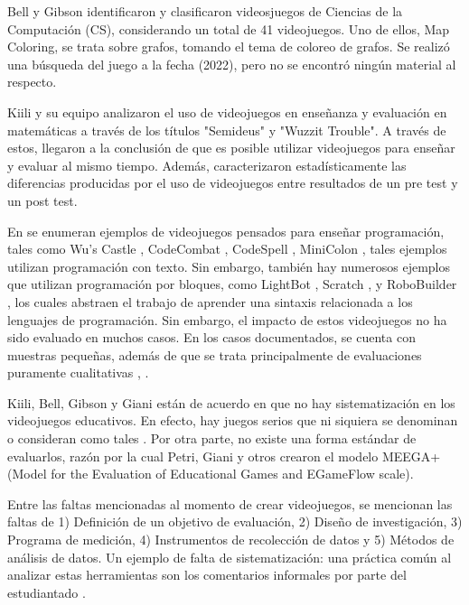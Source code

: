 \documentclass[submission]{eptcs}
\begin{document}
Bell y Gibson \cite{evaluation_of_games_for_teaching_cs} identificaron y clasificaron videosjuegos de Ciencias de la Computación (CS),
considerando un total de 41 videojuegos. Uno de ellos, Map Coloring, se trata sobre grafos, tomando el tema de coloreo de grafos.
Se realizó una búsqueda del juego a la fecha (2022), pero no se encontró ningún material al respecto.

Kiili y su equipo \cite{using_videogames_maths} analizaron el uso de videojuegos en enseñanza
y evaluación en matemáticas a través de los títulos "Semideus" y "Wuzzit Trouble". A través
de estos, llegaron a la conclusión de que es posible utilizar videojuegos para enseñar y
evaluar al mismo tiempo. Además, caracterizaron estadísticamente las diferencias producidas por el uso
de videojuegos entre resultados de un pre test y un post test.

En \cite{video_game_foster_computational_thinking} se enumeran ejemplos de videojuegos pensados para enseñar programación,
tales como Wu's Castle \cite{wuscastle}, CodeCombat \cite{CodeCombat}, CodeSpell \cite{codespells}, MiniColon \cite{minicolon},
tales ejemplos utilizan programación con texto. Sin embargo, también hay numerosos ejemplos que utilizan programación por
bloques, como LightBot \cite{LightBot}, Scratch \cite{maloney2010scratch}, \cite{scratch} y RoboBuilder \cite{RoboBuilder}, los
cuales abstraen el trabajo de aprender una sintaxis relacionada a los lenguajes de programación.
Sin embargo, el impacto de estos videojuegos no ha sido evaluado en muchos casos. En los casos documentados, se cuenta con
muestras pequeñas, además de que se trata principalmente de evaluaciones puramente cualitativas \cite{video_game_foster_computational_thinking},
\cite{effectiveness_gbl}.


Kiili, Bell, Gibson y Giani \cite{petri2018method} están de acuerdo en que no hay sistematización
en los videojuegos educativos. En efecto, hay juegos serios que ni siquiera se denominan o consideran como tales
\cite{evaluation_of_games_for_teaching_cs}. Por otra parte, no existe una forma estándar de evaluarlos, razón por
la cual Petri, Giani y otros \cite{petri2018method} crearon el modelo MEEGA+ (Model for the Evaluation of Educational
Games and EGameFlow scale).

Entre las faltas mencionadas al momento de crear videojuegos, se mencionan las faltas de 1) Definición de un objetivo
de evaluación, 2) Diseño de investigación, 3) Programa de medición, 4) Instrumentos de recolección de datos y 5) Métodos
de análisis de datos. Un ejemplo de falta de sistematización: una práctica común al analizar estas herramientas son los 
comentarios informales por parte del estudiantado \cite{petri2018method}.
\end{document}
